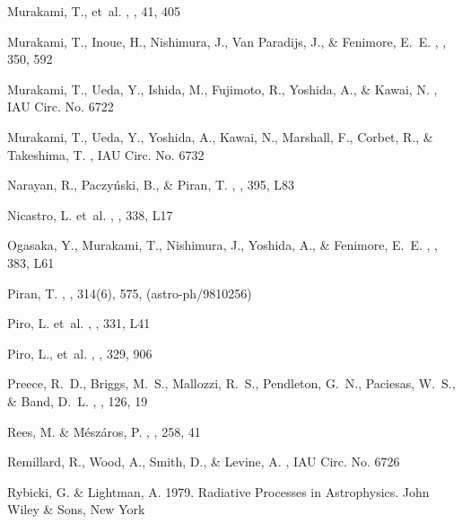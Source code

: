 \documentclass{aastex}
\begin{document}
\begin{multicols}{2}
\begin{thebibliography}{}
 {Murakami}, T., et~al.
, \pasj, 41, 405

{Murakami}, T., {Inoue}, H., {Nishimura}, J., {Van Paradijs}, J., \&
  {Fenimore}, E.~E.
, \nat, 350, 592

Murakami, T., Ueda, Y., Ishida, M., Fujimoto, R., Yoshida, A., \& Kawai, N.
, IAU Circ. No. 6722

Murakami, T., Ueda, Y., Yoshida, A., Kawai, N., Marshall, F., Corbet, R., \&
  Takeshima, T.
, IAU Circ. No. 6732

Narayan, R., Paczy\'{n}ski, B., \& Piran, T.
, \apjl, 395, L83

Nicastro, L. et~al.
, \aap, 338, L17

{Ogasaka}, Y., {Murakami}, T., {Nishimura}, J., {Yoshida}, A., \& {Fenimore},
  E.~E.
, \apjl, 383, L61

Piran, T.
, \physrep, 314(6), 575, (astro-ph/9810256)

Piro, L. et~al.
, \aap, 331, L41

 {Piro}, L., et~al.
, \aap, 329, 906

{Preece}, R.~D., {Briggs}, M.~S., {Mallozzi}, R.~S., {Pendleton}, G.~N.,
  {Paciesas}, W.~S., \& {Band}, D.~L.
, \apjs, 126, 19

Rees, M. \& M\'{e}sz\'{a}ros, P.
, \mnras, 258, 41

Remillard, R., Wood, A., Smith, D., \& Levine, A.
, IAU Circ. No. 6726

Rybicki, G. \& Lightman, A. 1979.
\newblock Radiative {Processes in Astrophysics}.
\newblock John Wiley \& Sons, New York


\end{thebibliography}
\end{multicols}
\end{document}
